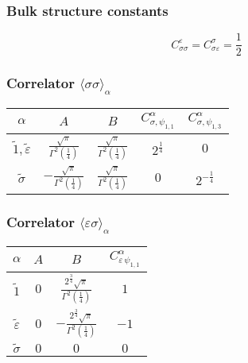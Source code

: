 \documentclass[a4paper,12pt]{report}
\begin{document}
\subsubsection{Bulk structure constants}
\begin{displaymath}
C_{\sigma\sigma}^{\varepsilon}=C_{\sigma\varepsilon}^{\sigma}=\frac{1}{2}
\end{displaymath}

\subsubsection{Correlator $\langle\sigma\sigma\rangle_{\alpha}$}
\begin{center}
\begin{tabular}{|c|c|c|c|c|}\hline
$\alpha$ &  $A$  & $ B$ & $ C_{\sigma,\psi_{1,1}}^{\alpha}$ & $ C_{\sigma,\psi_{1,3}}^{\alpha}$  \\ \hline

$\tilde{1}, \tilde{\varepsilon}$ & $\frac{\sqrt{\pi}}{\Gamma^{2}\left(\frac{1}{4}\right)}$ &
$\frac{\sqrt{\pi}}{\Gamma^{2}\left(\frac{1}{4}\right)}$& $2^{\frac{1}{4}}$ & $0$ \\
$\tilde{\sigma}$ & $-\frac{\sqrt{\pi}}{\Gamma^{2}\left(\frac{1}{4}\right)}$ &
$\frac{\sqrt{\pi}}{\Gamma^{2}\left(\frac{1}{4}\right)}$&  $0$ & $2^{-\frac{1}{4}}$ \\ \hline

\end{tabular}
\end{center}

\subsubsection{Correlator $\langle\varepsilon\sigma\rangle_{\alpha}$}
\begin{center}
\begin{tabular}{|c|c|c|c|}\hline
$\alpha$ &  $A$  & $ B$ & $ C_{\varepsilon\,\psi_{1,1}}^{\alpha}$  \\
\hline

$\tilde{1}$ & $0$ &
$\frac{2^{\frac{3}{4}}\sqrt{\pi}}{\Gamma^{2}\left(\frac{1}{4}\right)}$& $1$  \\
$\tilde{\varepsilon}$ & $0$ &
$-\frac{2^{\frac{3}{4}}\sqrt{\pi}}{\Gamma^{2}\left(\frac{1}{4}\right)}$& $-1$  \\
$\tilde{\sigma}$ & $0$ & $0$&  $0$  \\ \hline

\end{tabular}
\end{center}
\end{document}
